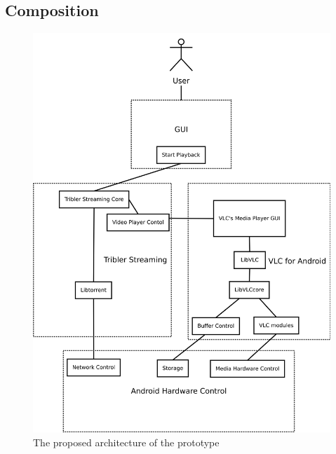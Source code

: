 \subsection{Composition}
\label{sec:comp}
\begin{figure}[h!]
	\includegraphics[width=\textwidth]{contents/ad/images/proposed_architecture.png}
	\caption{The proposed architecture of the prototype}
	\label{fig:prop_arch}
\end{figure}
